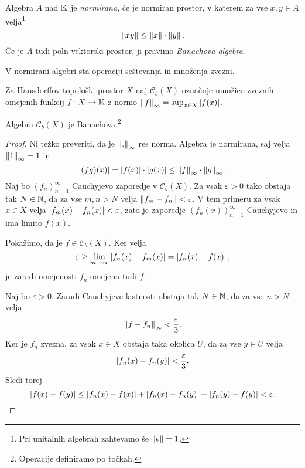 \begin{definicija}
Algebra $A$ nad $\mathbb{K}$ je \emph{normirana},
če je normiran prostor, v katerem za vse $x,y \in A$
velja\footnote{Pri unitalnih algebrah zahtevamo še $\left\lVert e\right\rVert = 1$.}
\[
\left\lVert xy\right\rVert \leq \left\lVert x\right\rVert \cdot \left\lVert y\right\rVert.
\]
Če je $A$ tudi poln vektorski prostor, ji pravimo
\emph{Banachova algebra}.
\end{definicija}

\begin{opomba}
V normirani algebri sta operaciji seštevanja in množenja zvezni.
\end{opomba}

\begin{definicija}
Za Hausdorffov topološki prostor $X$ naj $\mathcal{C}_b(X)$
označuje množico zveznih omejenih funkcij $f \colon X \to \mathbb{K}$ z
normo $\left\lVert f\right\rVert_\infty = \sup_{x \in X} \left\lvert f(x)\right\rvert$.
\end{definicija}

\begin{trditev}
Algebra $\mathcal{C}_b(X)$ je Banachova.\footnote{Operacije
definiramo po točkah.}
\end{trditev}

\begin{proof}
Ni težko preveriti, da je $\left\lVert .\right\rVert_\infty$ res norma. Algebra je
normirana, saj velja $\left\lVert 1\right\rVert_\infty = 1$ in
\[
\left\lvert (fg)(x)\right\rvert = \left\lvert f(x)\right\rvert \cdot \left\lvert g(x)\right\rvert \leq
\left\lVert f\right\rVert_\infty \cdot \left\lVert g\right\rVert_\infty.
\]
Naj bo $(f_n)_{n=1}^\infty$ Cauchyjevo zaporedje v
$\mathcal{C}_b(X)$. Za vsak $\varepsilon > 0$ tako obstaja tak
$N \in \mathbb{N}$, da za vse $m, n > N$ velja
$\left\lVert f_m - f_n\right\rVert < \varepsilon$. V tem primeru za vsak $x \in X$
velja $\left\lvert f_m(x) - f_n(x)\right\rvert < \varepsilon$, zato je zaporedje
$(f_n(x))_{n=1}^\infty$ Cauchyjevo in ima limito $f(x)$.

Pokažimo, da je $f \in \mathcal{C}_b(X)$. Ker velja
\[
\varepsilon \geq \lim_{m \to \infty} \left\lvert f_n(x) - f_m(x)\right\rvert =
\left\lvert f_n(x) - f(x)\right\rvert,
\]
je zaradi omejenosti $f_n$ omejena tudi $f$.

Naj bo $\varepsilon > 0$. Zaradi Cauchyjeve lastnosti obstaja tak
$N \in \mathbb{N}$, da za vse $n > N$ velja
\[
\left\lVert f - f_n\right\rVert_\infty < \frac{\varepsilon}{3}.
\]
Ker je $f_n$ zvezna, za vsak $x \in X$ obstaja taka okolica $U$,
da za vse $y \in U$ velja
\[
\left\lvert f_n(x) - f_n(y)\right\rvert < \frac{\varepsilon}{3}.
\]
Sledi torej
\[
\left\lvert f(x) - f(y)\right\rvert \leq
\left\lvert f_n(x) - f(x)\right\rvert + \left\lvert f_n(x) - f_n(y)\right\rvert +\left\lvert f_n(y) - f(y)\right\rvert <
\varepsilon. \qedhere
\]
\end{proof}


